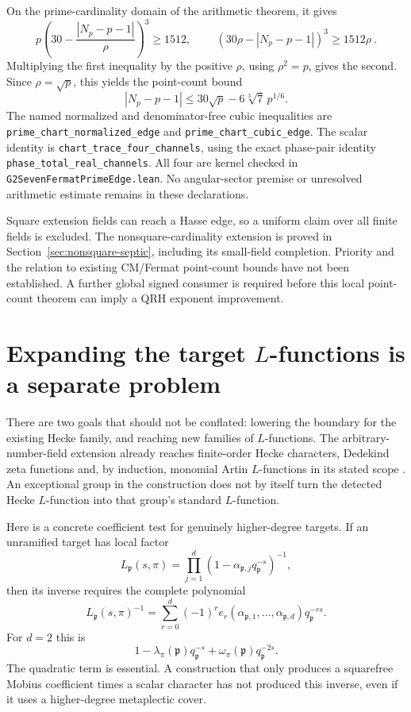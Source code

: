 \documentclass[11pt]{article}
\begin{document}
On the prime-cardinality domain of the arithmetic theorem, it gives
\[
 p\left(30-\frac{|N_p-p-1|}{\rho}\right)^3\ge1512,
 \qquad
 \boxed{\ (30\rho-|N_p-p-1|)^3\ge1512\rho\ }.
\]
Multiplying the first inequality by the positive \(\rho\), using
\(\rho^2=p\), gives the second. Since \(\rho=\sqrt p\), this yields
the point-count bound
\[
 |N_p-p-1|\le30\sqrt p-6\sqrt[3]7\,p^{1/6}.
\]
The named normalized and denominator-free cubic inequalities are
\texttt{prime\_chart\_normalized\_edge} and
\texttt{prime\_chart\_cubic\_edge}. The scalar identity is
\texttt{chart\_trace\_four\_channels}, using the exact phase-pair
identity \texttt{phase\_total\_real\_channels}.
All four are kernel checked in \texttt{G2SevenFermatPrimeEdge.lean}.
No angular-sector premise or unresolved arithmetic estimate remains
in these declarations.

Square extension fields can reach a Hasse edge, so a uniform claim
over all finite fields is excluded. The nonsquare-cardinality extension
is proved in Section~\ref{sec:nonsquare-septic}, including its small-field
completion. Priority and the relation to existing CM/Fermat point-count
bounds have not been established.
A further global signed consumer is required before this local
point-count theorem can imply a QRH exponent improvement.

\section{Expanding the target $L$-functions is a separate problem}

There are two goals that should not be conflated: lowering the boundary
for the existing Hecke family, and reaching new families of $L$-functions.
The arbitrary-number-field extension already reaches finite-order Hecke
characters, Dedekind zeta functions and, by induction, monomial Artin
$L$-functions in its stated scope \cite[Corollary 19.2]{LiuField}.
An exceptional group in the construction does not by itself turn the
detected Hecke $L$-function into that group's standard $L$-function.

Here is a concrete coefficient test for genuinely higher-degree targets.
If an unramified target has local factor
\[
 L_{\mathfrak p}(s,\pi)=
 \prod_{j=1}^d(1-\alpha_{\mathfrak p,j}q_{\mathfrak p}^{-s})^{-1},
\]
then its inverse requires the complete polynomial
\[
 L_{\mathfrak p}(s,\pi)^{-1}
 =\sum_{r=0}^d(-1)^r
 e_r(\alpha_{\mathfrak p,1},\ldots,\alpha_{\mathfrak p,d})
 q_{\mathfrak p}^{-rs}.
\]
For $d=2$ this is
\[
 1-\lambda_\pi(\mathfrak p)q_{\mathfrak p}^{-s}
   +\omega_\pi(\mathfrak p)q_{\mathfrak p}^{-2s}.
\]
The quadratic term is essential. A construction that only produces a
squarefree Mobius coefficient times a scalar character has not produced
this inverse, even if it uses a higher-degree metaplectic cover.
\end{document}
